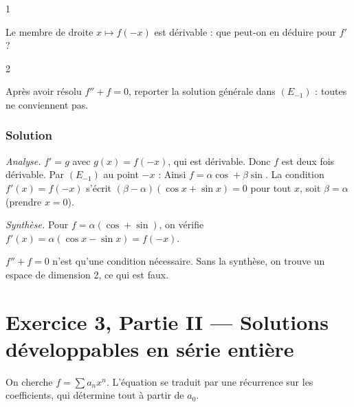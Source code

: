 \documentclass[11pt,a4paper]{article}
\newcommand{\equationajustee}[1]{%
  \sbox{\boiteequation}{$\displaystyle #1$}%
  \ifdim\wd\boiteequation>\linewidth
    \[\resizebox{\linewidth}{!}{\usebox{\boiteequation}}\]%
  \else
    \[#1\]%
  \fi}
\begin{document}
\begin{indication}{1}

Le membre de droite \(x\mapsto f(-x)\) est dérivable : que peut-on en déduire pour \(f'\) ?

\end{indication}

\begin{indication}{2}

Après avoir résolu \(f''+f=0\), reporter la solution générale dans \((E_{-1})\) : toutes ne conviennent pas.

\end{indication}

\hypertarget{solution-28}{%
\subsubsection{Solution}\label{solution-28}}

\emph{Analyse.} \(f'=g\) avec \(g(x)=f(-x)\), qui est dérivable. Donc \(f\) est deux fois dérivable. Par \((E_{-1})\) au point \(-x\) :
\equationajustee{\begin{aligned}
f''(x)&=-f'(-x)\\
&=-f(x).
\end{aligned}}
Ainsi \(f=\alpha\cos+\beta\sin\). La condition \(f'(x)=f(-x)\) s'écrit \((\beta-\alpha)(\cos x+\sin x)=0\) pour tout \(x\), soit \(\beta=\alpha\) (prendre \(x=0\)).

\emph{Synthèse.} Pour \(f=\alpha(\cos+\sin)\), on vérifie \(f'(x)=\alpha(\cos x-\sin x)=f(-x)\).
\equationajustee{\boxed{S_{-1}=\mathrm{Vect}(\cos+\sin).}}

\begin{piege}

\(f''+f=0\) n'est qu'une condition nécessaire. Sans la synthèse, on trouve un espace de dimension 2, ce qui est faux.

\end{piege}

\hypertarget{exercice-3-partie-ii-solutions-duxe9veloppables-en-suxe9rie-entiuxe8re}{%
\section{Exercice 3, Partie II --- Solutions développables en série entière}\label{exercice-3-partie-ii-solutions-duxe9veloppables-en-suxe9rie-entiuxe8re}}

On cherche \(f=\sum a_nx^n\). L'équation se traduit par une récurrence sur les coefficients, qui détermine tout à partir de \(a_0\).
\end{document}
